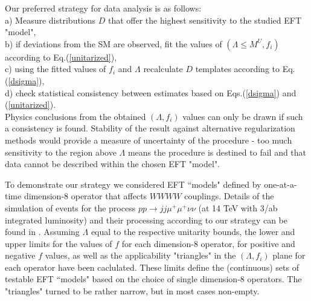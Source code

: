 \documentclass[../report.tex]{subfiles}
\begin{document}
Our preferred strategy for data analysis is as follows:\\
a)  Measure  distributions $D$ that
offer the highest sensitivity to the studied EFT "model",\\
b) if deviations from the SM are observed, fit the values of 
$(\Lambda\leq M^U, f_i)$  according to 
Eq.(\ref{unitarized}),\\
c) using the fitted values of $f_i$ and $\Lambda$ recalculate 
$D$  templates 
according to 
Eq.(\ref{dsigma}),\\
d) check statistical consistency between estimates based on Eqs.(\ref{dsigma}) and (\ref{unitarized}). \\
 Physics conclusions from the obtained $(\Lambda, f_i)$ values can only be drawn
if such a consistency is found.  
%
%
Stability of the result against alternative 
regularization methods  would provide a measure of uncertainty of the procedure - too much
sensitivity to the region above $\Lambda$ means the procedure is destined to fail
and  that data cannot be described within the chosen EFT "model".

%

To demonstrate our strategy we considered EFT ``models" defined by 
one-at-a-time dimension-8 operator that affects $WWWW$ couplings. Details of the simulation of events for  the process 
$pp \to jj\mu^+\mu^+\nu\nu$ (at 14 TeV with 3/ab integrated luminosity) and their processing according to our strategy can be found in \cite{Kalinowski:2018oxd}. 
Assuming $\Lambda$ equal to the respective unitarity bounds,
the lower and upper limits for the values of $f$ for each dimension-8 operator, for positive
and negative $f$ values, as well as the applicability "triangles" in the $(\Lambda,f_i)$ plane for each operator have been caclulated.
  These limits define the (continuous) sets of testable 
EFT ``models" based on the choice of single dimension-8 operators. 
The "triangles"  turned to be rather narrow, but in most cases non-empty.
\end{document}
